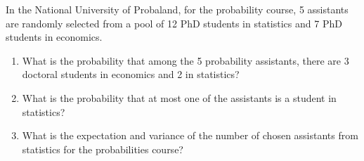 \documentclass[12pt,thmsa]{article}
\begin{document}
In the National University of Probaland, for the probability course, 5 assistants are randomly selected from a pool of 12 PhD students in statistics and 7 PhD students in economics.

\begin{enumerate}
\item What is the probability that among the 5 probability assistants, there are 3 doctoral students in economics and 2 in statistics?
\item What is the probability that at most one of the assistants is a student in statistics?
\item What is the expectation and variance of the number of chosen assistants from statistics for the probabilities course?
\end{enumerate}
\end{document}

